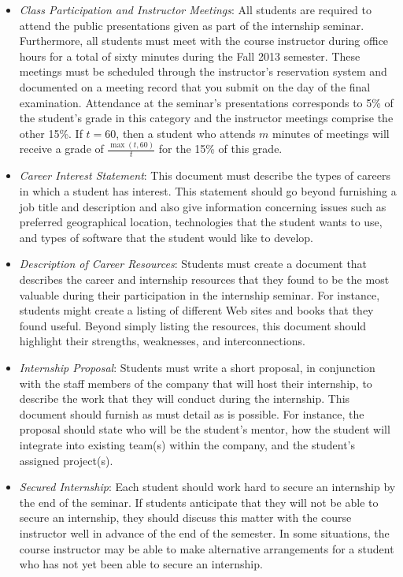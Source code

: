 \begin{itemize}

	\item {\em Class Participation and Instructor Meetings}: All students are required to attend the public
		presentations given as part of the internship seminar.  Furthermore, all students must meet with the
		course instructor during office hours for a total of sixty minutes during the Fall 2013 semester.  These
		meetings must be scheduled through the instructor's reservation system and documented on a meeting record that
		you submit on the day of the final examination. Attendance at the seminar's presentations corresponds to 5\% of
		the student's grade in this category and the instructor meetings comprise the other 15\%. If $t=60$, then a
		student who attends $m$ minutes of meetings will receive a grade of $\frac{\max{(t,60)}}{t}$ for the 15\%
		of this grade.
		
	\item {\em Career Interest Statement}: This document must describe the types of careers in which a student has
		interest. This statement should go beyond furnishing a job title and description and also give
		information concerning issues such as preferred geographical location, technologies that the student wants to
		use, and types of software that the student would like to develop. 	

	\item {\em Description of Career Resources}:  Students must create a document that describes the career and
		internship resources that they found to be the most valuable during their participation in the internship
		seminar. For instance, students might create a listing of different Web sites and books that they found useful. 
		Beyond simply listing the resources, this document should highlight their strengths, weaknesses, and interconnections. 		

	\item {\em Internship Proposal}: Students must write a short proposal, in conjunction with the staff members of the
		company that will host their internship, to describe the work that they will conduct during the internship.
		This document should furnish as must detail as is possible.  For instance, the proposal should state who will be
		the student's mentor, how the student will integrate into existing team(s) within the company, and the
		student's assigned project(s). 

	\item {\em Secured Internship}: Each student should work hard to secure an internship by the end of the seminar.  If
		students anticipate that they will not be able to secure an internship, they should discuss this matter with the
		course instructor well in advance of the end of the semester.  In some situations, the course instructor may be 
		able to make alternative arrangements for a student who has not yet been able to secure an internship.


\end{itemize}
